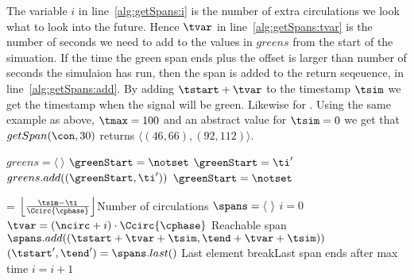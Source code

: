 The variable $i$ in line~\ref{alg:getSpans:i} is the number of extra circulations we look what to look into the future.
Hence $\tvar$ in line~\ref{alg:getSpans:tvar} is the number of seconds we need to add to the values in $greens$ from the start of the simuation.
If the time the green span ends plus the offset is larger than number of seconds the simulaion has run, then the span is added to the return seqeuence, \spans in line~\ref{alg:getSpans:add}.
By adding $\tstart + \tvar$ to the timestamp $\tsim$ we get the timestamp when the signal will be green. 
Likewise for \tend.
Using the same example as above, $\tmax=100$ and an abstract value for $\tsim=0$ we get that $getSpan(\con, 30)$ returns $\langle(46,66), (92,112)\rangle$.%

\begin{algorithm}
\caption{$getSpans(\con, \ti)$}\label{alg.getSpans}
\begin{algorithmic}[1]
\State $greens = \langle\ \rangle$\label{alg:getSpans:initGreens}
\State $\greenStart = \notset$\label{alg:getSpans:initgreenS}
\label{alg:getSpans:GreensFor}
\label{alg:getSpans:GreenBegin}
\State $\greenStart = \ti'$\label{alg:getSpans:storet}
\label{alg:getSpans:GreenEnd}
\State $greens.add((\greenStart, \ti'))$\label{alg:getSpans:add}
\State $\greenStart=\notset$\label{alg:getSpans:resetnotset}
\EndIf
\EndFor\label{alg:getSpans:GreensEnd}

\State \ncirc = $\left \lfloor \frac{\tsim-\ti}{\Ccirc{\cphase}} \right \rfloor$\Comment Number of circulations\label{alg:getSpans:ncirc}
\State $\spans = \langle\ \rangle$\label{alg:getSpans:initSpans}
\State $i = 0$\label{alg:getSpans:i}
\label{alg:getSpans:whilebegin}
\label{alg:getSpans:forbegin}
\State $\tvar = (\ncirc+i)\cdot \Ccirc{\cphase}$\label{alg:getSpans:tvar}
\If {$\tend+\tvar> \tsim-\ti$}\Comment Reachable span
\State $\spans.add((\tstart + \tvar+\tsim, \tend + \tvar+ \tsim))$\label{alg:getSpans:add}
\EndIf
\EndFor
\State $(\tstart',\tend') = \spans.last()$ \Comment Last element
\label{alg:getSpans:breakCond}
\State break\Comment Last span ends after max time
\EndIf
\State $i=i+1$
\EndWhile\label{alg:getSpans:endWhile}
\State\Return \spans
\end{algorithmic}
\end{algorithm}



